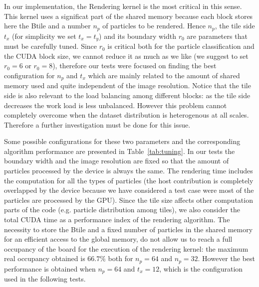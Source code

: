 \documentclass[1p]{elsarticle}
\begin{document}
In our implementation, the Rendering kernel is the most critical in this sense. This kernel uses a significat part of the shared memory because each block stores here the Btile and a number $n_p$ of particles to be rendered. 
Hence $n_p$, the tile side $t_x$ (for simplicity we set $t_x=t_y$) and its boundary width $r_0$ are parameters that must be carefully tuned. 
Since $r_0$ is critical both for the particle classification and the CUDA block size, we cannot reduce it as much as we like (we suggest to set $r_0=6$ or $r_0=8$), therefore our tests were focused on finding the best configuration for $n_p$ and $t_x$ which are mainly related to the amount of shared memory used and quite independent of the image resolution. Notice that the tile side is also relevant to the load balancing among different blocks: as the tile side decreases the work load is less unbalanced. However this problem cannot completely overcome when the dataset distribution is heterogenous at all scales. Therefore a further investigation must be done for this issue.

Some possible configurations for these two parameters and the corresponding algorithm performance are presented in Table~\ref{tab:tuning}. In our tests the boundary width and the image resolution are fixed so that the amount of particles processed by the device is always the same. The rendering time includes the computation for all the types of particles (the host contribution is completely overlapped by the device because we have considered a test case were most of the particles are processed by the GPU). Since the tile size affects other computation parts of the code (e.g. particle distribution among tiles), we also consider the total CUDA time as a performance index of the rendering algorithm. 
The necessity to store the Btile and a fixed number of particles in the shared memory for an efficient access to the global memory, do not allow us to reach a full occupancy of the board for the execution of the rendering kernel: the maximum real occupancy obtained is $66.7\%$ both for $n_p = 64$ and $n_p=32$. However the best performance is obtained when $n_p=64$ and $t_x = 12$, which is the configuration used in the following tests.
\end{document}
